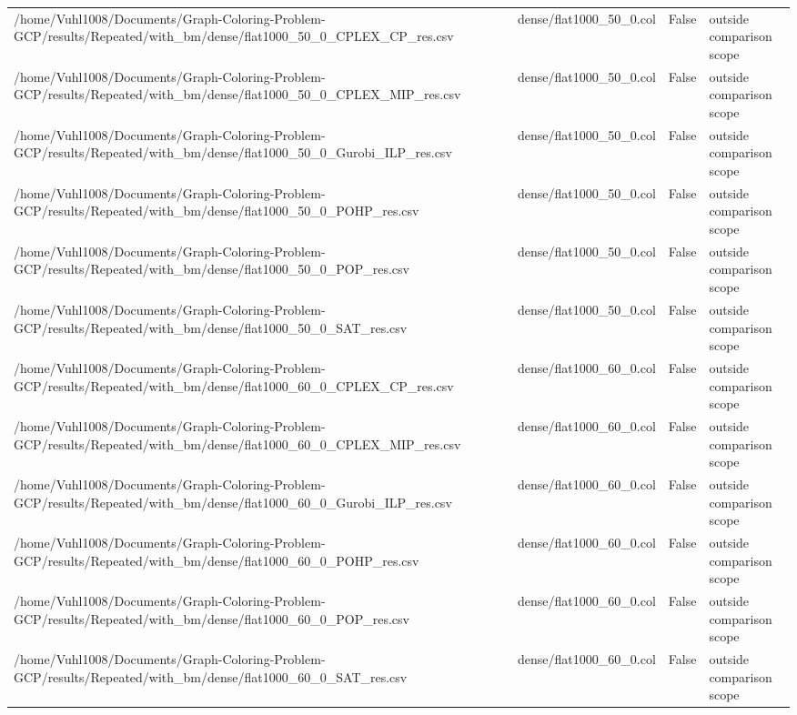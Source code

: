 \begin{table}[htbp]
\begin{tabular}{llll}
/home/Vuhl1008/Documents/Graph-Coloring-Problem-GCP/results/Repeated/with\_bm/dense/flat1000\_50\_0\_CPLEX\_CP\_res.csv & dense/flat1000\_50\_0.col & False & outside comparison scope \\
/home/Vuhl1008/Documents/Graph-Coloring-Problem-GCP/results/Repeated/with\_bm/dense/flat1000\_50\_0\_CPLEX\_MIP\_res.csv & dense/flat1000\_50\_0.col & False & outside comparison scope \\
/home/Vuhl1008/Documents/Graph-Coloring-Problem-GCP/results/Repeated/with\_bm/dense/flat1000\_50\_0\_Gurobi\_ILP\_res.csv & dense/flat1000\_50\_0.col & False & outside comparison scope \\
/home/Vuhl1008/Documents/Graph-Coloring-Problem-GCP/results/Repeated/with\_bm/dense/flat1000\_50\_0\_POHP\_res.csv & dense/flat1000\_50\_0.col & False & outside comparison scope \\
/home/Vuhl1008/Documents/Graph-Coloring-Problem-GCP/results/Repeated/with\_bm/dense/flat1000\_50\_0\_POP\_res.csv & dense/flat1000\_50\_0.col & False & outside comparison scope \\
/home/Vuhl1008/Documents/Graph-Coloring-Problem-GCP/results/Repeated/with\_bm/dense/flat1000\_50\_0\_SAT\_res.csv & dense/flat1000\_50\_0.col & False & outside comparison scope \\
/home/Vuhl1008/Documents/Graph-Coloring-Problem-GCP/results/Repeated/with\_bm/dense/flat1000\_60\_0\_CPLEX\_CP\_res.csv & dense/flat1000\_60\_0.col & False & outside comparison scope \\
/home/Vuhl1008/Documents/Graph-Coloring-Problem-GCP/results/Repeated/with\_bm/dense/flat1000\_60\_0\_CPLEX\_MIP\_res.csv & dense/flat1000\_60\_0.col & False & outside comparison scope \\
/home/Vuhl1008/Documents/Graph-Coloring-Problem-GCP/results/Repeated/with\_bm/dense/flat1000\_60\_0\_Gurobi\_ILP\_res.csv & dense/flat1000\_60\_0.col & False & outside comparison scope \\
/home/Vuhl1008/Documents/Graph-Coloring-Problem-GCP/results/Repeated/with\_bm/dense/flat1000\_60\_0\_POHP\_res.csv & dense/flat1000\_60\_0.col & False & outside comparison scope \\
/home/Vuhl1008/Documents/Graph-Coloring-Problem-GCP/results/Repeated/with\_bm/dense/flat1000\_60\_0\_POP\_res.csv & dense/flat1000\_60\_0.col & False & outside comparison scope \\
/home/Vuhl1008/Documents/Graph-Coloring-Problem-GCP/results/Repeated/with\_bm/dense/flat1000\_60\_0\_SAT\_res.csv & dense/flat1000\_60\_0.col & False & outside comparison scope \\

\end{tabular}
\end{table}
